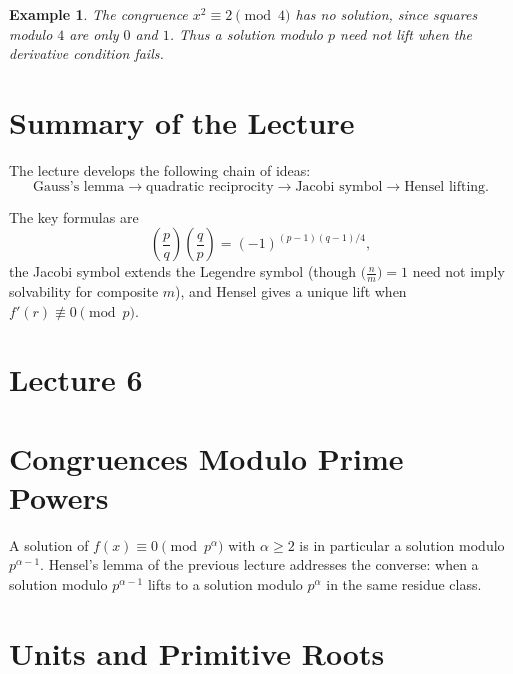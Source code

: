 \documentclass[11pt]{article}
\newtheorem{example}[theorem]{Example}
\theoremstyle{remark}
\begin{document}
\begin{example}
The congruence $x^2\equiv 2\pmod 4$ has no solution, since squares modulo
$4$ are only $0$ and $1$. Thus a solution modulo $p$ need not lift when
the derivative condition fails.
\end{example}

\section*{Summary of the Lecture}

The lecture develops the following chain of ideas:
\[
\boxed{
\text{Gauss's lemma}
\longrightarrow
\text{quadratic reciprocity}
\longrightarrow
\text{Jacobi symbol}
\longrightarrow
\text{Hensel lifting}
}.
\]

The key formulas are
\[
    \left(\frac pq\right)
    \left(\frac qp\right)
    =
    (-1)^{(p-1)(q-1)/4},
\]
the Jacobi symbol extends the Legendre symbol (though
$\bigl(\tfrac nm\bigr)=1$ need not imply solvability for composite $m$),
and Hensel gives a unique lift when $f'(r)\not\equiv 0\pmod p$.

\clearpage

\section*{Lecture 6}

\section{Congruences Modulo Prime Powers}

A solution of $f(x)\equiv 0\pmod{p^\alpha}$ with $\alpha\ge 2$ is in
particular a solution modulo $p^{\alpha-1}$. Hensel's lemma of the previous
lecture addresses the converse: when a solution modulo $p^{\alpha-1}$ lifts
to a solution modulo $p^\alpha$ in the same residue class.

\section{Units and Primitive Roots}
\end{document}
